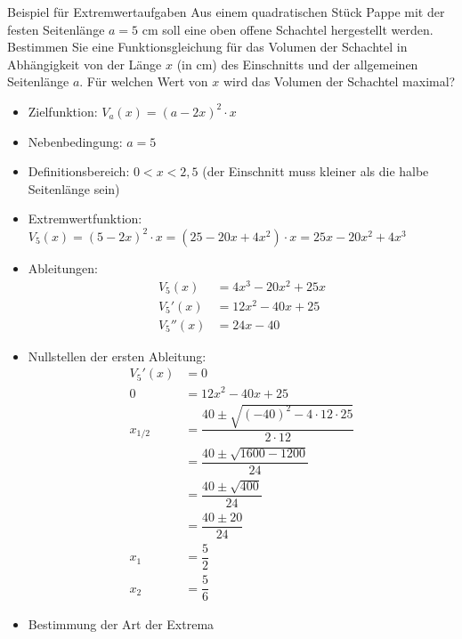  \begin{bsp}{Beispiel für Extremwertaufgaben}{}
Aus einem quadratischen Stück Pappe mit der festen Seitenlänge $a = 5\text{ cm}$ soll eine oben offene Schachtel hergestellt werden. Bestimmen Sie eine Funktionsgleichung für das Volumen der Schachtel in Abhängigkeit von der Länge $x$ (in cm) des Einschnitts und der allgemeinen Seitenlänge $a$. Für welchen Wert von $x$ wird das Volumen der Schachtel maximal? 
\begin{itemize}
    \item Zielfunktion: $V_a(x) = \left(a-2x\right)^2 \cdot x$
    \item Nebenbedingung: $a = 5$
    \item Definitionsbereich: $0<x<2{,}5$ (der Einschnitt muss kleiner als die halbe Seitenlänge sein)
    \item Extremwertfunktion: $V_5(x) = \left(5-2x\right)^2 \cdot x = \left(25 -20x +4x^2\right)\cdot x = 25x-20x^2 +4x^3$
    \item Ableitungen:
    \begin{equation*}
        \begin{split}
            V_5(x) &= 4x^3 -20x^2 +25x\\
          V_5'(x) &= 12x^2 -40x +25\\
          V_5''(x) &= 24x-40
        \end{split}
    \end{equation*}
    \item Nullstellen der ersten Ableitung:
        \begin{equation*}
        \begin{split}
          V_5'(x) &= 0\\
        0&= 12x^2 -40x +25\\
        x_{1/2} &= \dfrac{40 \pm \sqrt{(-40)^2 -4\cdot 12\cdot 25}}{2\cdot 12}\\
        &= \dfrac{40 \pm \sqrt{1600 -1200}}{24}\\
        &= \dfrac{40 \pm \sqrt{400}}{24}\\
        &= \dfrac{40 \pm 20}{24}\\
        x_1&= \dfrac{5}{2}\\
        x_2&= \dfrac{5}{6}
        \end{split}
    \end{equation*}
    \item Bestimmung der Art der Extrema
            \begin{equation*}
        \begin{split}

\end{split}
\end{equation*}
\end{itemize}
\end{bsp}
